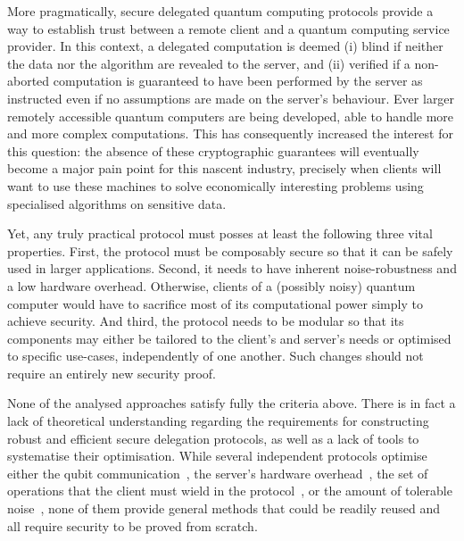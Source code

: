 \documentclass[12pt]{iopart}
\renewcommand{\1}{\mathds{1}}
\begin{document}
More pragmatically, secure delegated quantum computing protocols provide a way to establish trust between a remote client and a quantum computing service provider. In this context, a delegated computation is deemed (i) blind if neither the data nor the algorithm are revealed to the server, and (ii) verified if a non-aborted computation is guaranteed to have been performed by the server as instructed even if no assumptions are made on the server's behaviour. Ever larger remotely accessible quantum computers are being developed, able to handle more and more complex computations. This has consequently increased the interest for this question: the absence of these cryptographic guarantees will eventually become a major pain point for this nascent industry, precisely when clients will want to use these machines to solve economically interesting problems using specialised algorithms on sensitive data.

Yet, any truly practical protocol must posses at least the following three vital properties. First, the protocol must be composably secure so that it can be safely used in larger applications. Second, it needs to have inherent noise-robustness and a low hardware overhead. Otherwise, clients of a (possibly noisy) quantum computer would have to sacrifice most of its computational power simply to achieve security. And third, the protocol needs to be modular so that its components may either be tailored to the client's and server's needs or optimised to specific use-cases, independently of one another. Such changes should not require an entirely new security proof.

None of the analysed approaches satisfy fully the criteria above. There is in fact a lack of theoretical understanding regarding the requirements for constructing robust and efficient secure delegation protocols, as well as a lack of tools to systematise their optimisation. While several independent protocols optimise either the qubit communication~\cite{KDK15:optimising,Z21:succinct}, the server's hardware overhead~\cite{KW17:optimised,XTH20:improved,LMKO21:verifying}, the set of operations that the client must wield in the protocol~\cite{FKD18:reducing}, or the amount of tolerable noise~\cite{LMKO21:verifying}, none of them provide general methods that could be readily reused and all require security to be proved from scratch.
\end{document}
